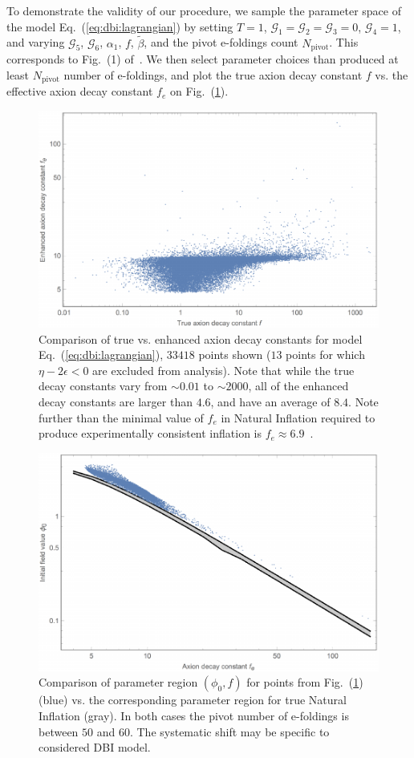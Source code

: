 \documentclass[12pt]{article}
\begin{document}
To demonstrate the validity of our procedure, we sample the parameter space of the model Eq.~(\ref{eq:dbi:lagrangian}) by setting $T = 1$, $\mathcal{G}_1 = \mathcal{G}_2 = \mathcal{G}_3 = 0$, $\mathcal{G}_4 = 1$, and varying $\mathcal{G}_5$, $\mathcal{G}_6$, $\alpha_1$, $f$, $\tilde\beta$, and the pivot e-foldings count $N_\text{pivot}$.
This corresponds to Fig.~(1) of~\cite{Nath:2018xxe}.
We then select parameter choices than produced at least $N_\text{pivot}$ number of e-foldings, and plot the true axion decay constant $f$ vs. the effective axion decay constant $f_e$ on Fig.~(\ref{fig:DBI:parameters}).

\begin{figure} \label{fig:DBI:parameters} %
  \centering
  \includegraphics[width = 0.5 \textwidth]{figs/fige.pdf}
  \caption{Comparison of true vs. enhanced axion decay constants for model Eq.~(\ref{eq:dbi:lagrangian}), $33418$ points shown ($13$ points for which $\eta - 2\epsilon < 0$ are excluded from analysis).
    Note that while the true decay constants vary from $\sim 0.01$ to $\sim 2000$, all of the enhanced decay constants are larger than $4.6$, and have an average of $8.4$.
    Note further than the minimal value of $f_e$ in Natural Inflation required to produce experimentally consistent inflation is $f_e \approx 6.9$~\cite{Ade:2015lrj}.}
\end{figure}

\begin{figure} \label{fig:DBI:observables} %
  \centering
  \includegraphics[width = 0.5 \textwidth]{figs/figc.pdf}
  \caption{Comparison of parameter region $\left(\phi_0, f\right)$ for points from Fig.~(\ref{fig:DBI:parameters}) (blue) vs. the corresponding parameter region for true Natural Inflation (gray).
    In both cases the pivot number of e-foldings is between $50$ and $60$.
    The systematic shift may be specific to considered DBI model.}
\end{figure}
\end{document}
